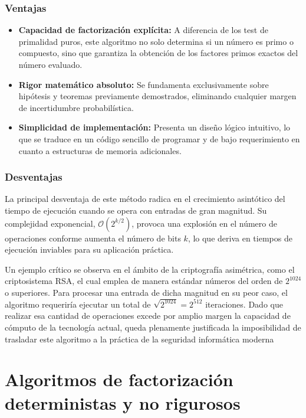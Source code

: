 \documentclass[11pt,a4paper,spanish]{book}
\begin{document}
\subsubsection{Ventajas}

\begin{itemize}
    \item \textbf{Capacidad de factorización explícita:} A diferencia de los test de primalidad puros, este algoritmo no solo determina si un número es primo o compuesto, sino que garantiza la obtención de los factores primos exactos del número evaluado.
    \item \textbf{Rigor matemático absoluto:} Se fundamenta exclusivamente sobre hipótesis y teoremas previamente demostrados, eliminando cualquier margen de incertidumbre probabilística.
    \item \textbf{Simplicidad de implementación:} Presenta un diseño lógico intuitivo, lo que se traduce en un código sencillo de programar y de bajo requerimiento en cuanto a estructuras de memoria adicionales.
\end{itemize}

\subsubsection{Desventajas}

La principal desventaja de este método radica en el crecimiento asintótico del tiempo de ejecución cuando se opera con entradas de gran magnitud. Su complejidad exponencial, $\mathcal{O} (2^{k/2})$, provoca una explosión en el número de operaciones conforme aumenta el número de bits $k$, lo que deriva en tiempos de ejecución inviables para su aplicación práctica.

Un ejemplo crítico se observa en el ámbito de la criptografía asimétrica, como el criptosistema RSA, el cual emplea de manera estándar números del orden de $2^{1024}$ o superiores. Para procesar una entrada de dicha magnitud en su peor caso, el algoritmo requeriría ejecutar un total de $\sqrt{2^{1024}} = 2^{512}$ iteraciones. Dado que realizar esa cantidad de operaciones excede por amplio margen la capacidad de cómputo de la tecnología actual, queda plenamente justificada la imposibilidad de trasladar este algoritmo a la práctica de la seguridad informática moderna

\section{Algoritmos de factorización deterministas y no rigurosos}
\end{document}
